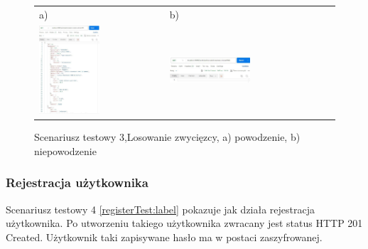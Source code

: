 \begin{figure}[htb]
  \centering
	\begin{tabular}{@{}ll@{}}
	a) & b) \\
  \includegraphics[width=0.5\textwidth]{rys06/postmanTest/winner.pdf} & 
	\includegraphics[width=0.5\textwidth]{rys06/postmanTest/badWinner.pdf}
	\end{tabular}
  \caption{Scenariusz testowy 3,Losowanie zwycięzcy, a) powodzenie, b) niepowodzenie}
  \label{winnerTest:label}
\end{figure}

\newpage
\subsubsection{Rejestracja użytkownika}
Scenariusz testowy 4 \ref{registerTest:label} pokazuje jak działa rejestracja użytkownika. Po utworzeniu takiego użytkownika zwracany jest status HTTP 201 Created. Użytkownik taki zapisywane hasło ma w postaci zaszyfrowanej.

